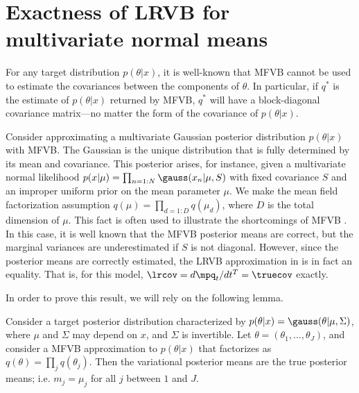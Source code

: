
\section{Exactness of LRVB for multivariate normal means} \label{app:mvn_exact}

For any target distribution $p(\theta | x)$, it is well-known that MFVB cannot
be used to estimate the covariances between the components of $\theta$. In
particular, if $q^*$ is the estimate of $p(\theta | x)$ returned by MFVB, $q^*$
will have a block-diagonal covariance matrix---no matter the form of the
covariance of $p(\theta | x)$.

Consider approximating a multivariate Gaussian posterior distribution
$p(\theta|x)$ with MFVB. The Gaussian is the unique distribution that is fully
determined by its mean and covariance. This posterior arises, for instance,
given a multivariate normal likelihood $p(x | \mu) = \prod_{n=1:N} \gauss(x_n |
\mu, S)$ with fixed covariance $S$ and an improper uniform prior on the mean
parameter $\mu$. We make the mean field factorization assumption
$q(\mu)=\prod_{d=1:D} q(\mu_d)$, where $D$ is the total dimension of $\mu$. This
fact is often used to illustrate the shortcomings of MFVB
\cite{wang:2005:inadequacy,bishop:2006:pattern,turner:2011:two}.
In this case, it is well known that the MFVB posterior means are correct, but the
marginal variances are underestimated if $S$ is not diagonal.
However, since the posterior means are correctly estimated,
the LRVB approximation in  is in fact an equality.
That is, for this model,
$\lrcov = d \mpq_t / d t^T = \truecov$ exactly.

In order to prove this result, we will rely on the following lemma.
%
\begin{lemma} \label{lem:lrvb_mvn}
%
  Consider a target posterior distribution characterized by $p(\theta | x) =
  \gauss(\theta | \mu, \Sigma)$, where $\mu$ and $\Sigma$ may depend on $x$, and
  $\Sigma$ is invertible. Let $\theta = (\theta_{1}, \ldots, \theta_{J})$, and
  consider a MFVB approximation to $p(\theta| x)$ that factorizes as $q(\theta) =
  \prod_{j} q(\theta_j)$. Then the variational posterior means are the true
  posterior means; i.e. $m_j = \mu_j$ for all $j$ between $1$ and $J$.
%
\end{lemma}


